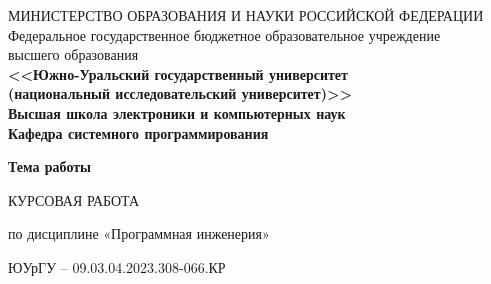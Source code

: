\newpage
\thispagestyle{empty}
\begin{adjustwidth}[]{0cm}{0cm}
\begin{center}
\begin{linespread}{1}


\small{
МИНИСТЕРСТВО ОБРАЗОВАНИЯ И НАУКИ РОССИЙСКОЙ ФЕДЕРАЦИИ\\
Федеральное государственное бюджетное образовательное учреждение\\
высшего образования\\
\textbf{<<Южно-Уральский государственный университет\\
(национальный исследовательский университет)>>\\
Высшая школа электроники и компьютерных наук\\
Кафедра системного программирования}
}






{
\large\textbf{Тема работы}

\vspace{1em}

\large{КУРСОВАЯ РАБОТА}

\vspace{-5pt}

\large{по дисциплине «Программная инженерия»}

\vspace{-5pt}

\large{ЮУрГУ – 09.03.04.2023.308-066.КР}

\vspace{-5pt}
}

\vspace{7em}


\end{linespread}
\end{center}
\end{adjustwidth}
